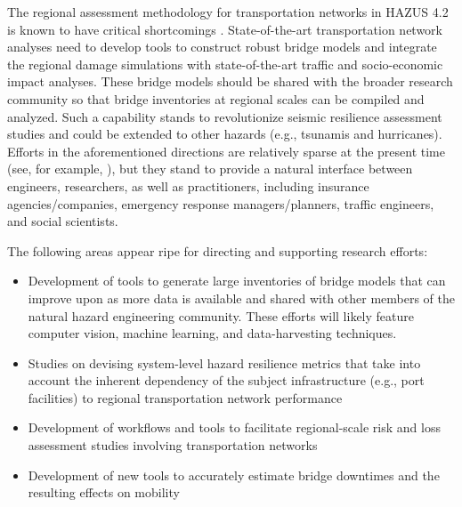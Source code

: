The regional assessment methodology for transportation networks in HAZUS 4.2 is known to have critical shortcomings \citep[e.g.][]{mangalathu2017bridge}. State-of-the-art transportation network analyses need to develop tools to construct robust bridge models and integrate the regional damage simulations with state-of-the-art traffic and socio-economic impact analyses. These bridge models should be shared with the broader research community so that bridge inventories at regional scales can be compiled and analyzed. Such a capability stands to revolutionize seismic resilience assessment studies and could be extended to other hazards (e.g., tsunamis and hurricanes). Efforts in the aforementioned directions are relatively sparse at the present time (see, for example, \citep{koc2020comprehensive}), but they stand to provide a natural interface between engineers, researchers, as well as practitioners, including insurance agencies/companies, emergency response managers/planners, traffic engineers, and social scientists. 

The following areas appear ripe for directing and supporting research efforts:
\begin{itemize}
    \item Development of tools to generate large inventories of bridge models that can improve upon as more data is available and shared with other members of the natural hazard engineering community. These efforts will likely feature computer vision, machine learning, and data-harvesting techniques.
    \item Studies on devising system-level hazard resilience metrics that take into account the inherent dependency of the subject infrastructure (e.g., port facilities) to regional transportation network performance
    \item Development of workflows and tools to facilitate regional-scale risk and loss assessment studies involving transportation networks
    \item Development of new tools to accurately estimate bridge downtimes and the resulting effects on mobility
\end{itemize}


